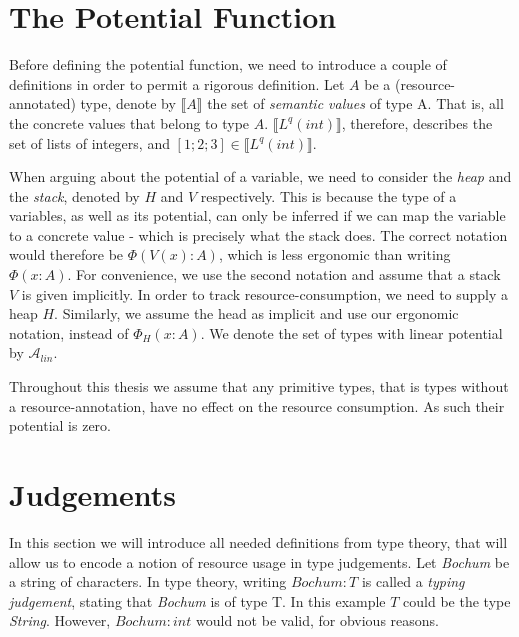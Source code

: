 \section{The Potential Function}
Before defining the potential function, we need to introduce a couple of definitions in order to permit a rigorous definition.
Let \(A\) be a (resource-annotated) type, denote by \(\llbracket A \rrbracket\) the set of \emph{semantic values} of type A. That is, all the concrete values that belong to type \(A\). \(\llbracket L^{q}(int)\rrbracket \), therefore, describes the set of lists of integers, and \([1;2;3] \in \llbracket L^{q}(int)\rrbracket \). 

When arguing about the potential of a variable, we need to consider the \emph{heap} and the \emph{stack}, denoted by \(H\) and \(V\) respectively. This is because the type of a variables, as well as its potential, can only be inferred if we can map the variable to a concrete value - which is precisely what the stack does. The correct notation would therefore be \(\Phi(V(x) : A)\), which is less ergonomic than writing \(\Phi(x : A)\). For convenience, we use the second notation and assume that a stack \(V\) is given implicitly.
In order to track resource-consumption, we need to supply a heap \(H\). Similarly, we assume the head as implicit and use our ergonomic notation, instead of \(\Phi_{H}(x : A)\).  
We denote the set of types with linear potential by \(\mathcal{A}_{lin}\). 

Throughout this thesis we assume that any primitive types, that is types without a resource-annotation, have no effect on the resource consumption. As such their potential is zero. 



\section{Judgements}
 In this section we will introduce all needed definitions from type theory, that will allow us to encode a notion of resource usage in type judgements.
 Let \emph{Bochum} be a string of characters. In type theory, writing \(Bochum: T\) is called a \emph{typing judgement}, stating that \emph{Bochum} is of type T. In this example \(T\) could be the type \emph{String}. However, \(Bochum : int\) would not be valid, for obvious reasons.
 
